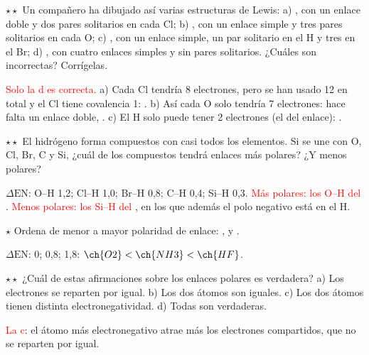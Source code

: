 \begin{exercise}
    \(\star\star\) Un compañero ha dibujado así varias estructuras de Lewis: a) , con un enlace doble y dos pares
    solitarios en cada Cl; b) , con un enlace simple y tres pares solitarios en cada O; c) , con un enlace simple,
    un par solitario en el H y tres en el Br; d) , con cuatro enlaces simples y sin pares solitarios. ¿Cuáles son
    incorrectas? Corrígelas.
    \begin{solu}
        \textcolor{red}{Solo la d es correcta.} a) Cada Cl tendría 8 electrones, pero se han usado 12 en total y el Cl tiene
        covalencia 1: . b) Así cada O solo tendría 7
        electrones: hace falta un enlace doble, . c) El H solo puede
        tener 2 electrones (el del enlace): .
    \end{solu}
\end{exercise}

\begin{exercise}
    \(\star\star\) El hidrógeno forma compuestos con casi todos los elementos. Si se une con O, Cl, Br, C y Si, ¿cuál de los
    compuestos tendrá enlaces más polares? ¿Y menos polares?
    \begin{solu}
        \(\Delta\mathrm{EN}\): O--H 1,2; Cl--H 1,0; Br--H 0,8; C--H 0,4; Si--H 0,3. \textcolor{red}{Más polares: los O--H del
        }. \textcolor{red}{Menos polares: los Si--H del }, en los que además el polo negativo está en el H.
    \end{solu}
\end{exercise}

\begin{exercise}
    \(\star\) Ordena de menor a mayor polaridad de enlace: ,  y .
    \begin{solu}
        \(\Delta\mathrm{EN}\): 0; 0,8; 1,8: \textcolor{red}{\(\ch{O2} < \ch{NH3} < \ch{HF}\)}.
    \end{solu}
\end{exercise}

\begin{exercise}
    \(\star\star\) ¿Cuál de estas afirmaciones sobre los enlaces polares es verdadera? a) Los electrones se reparten por igual.
    b) Los dos átomos son iguales. c) Los dos átomos tienen distinta electronegatividad. d) Todas son verdaderas.
    \begin{solu}
        \textcolor{red}{La c}: el átomo más electronegativo atrae más los electrones compartidos, que no se reparten por igual.
    \end{solu}
\end{exercise}

